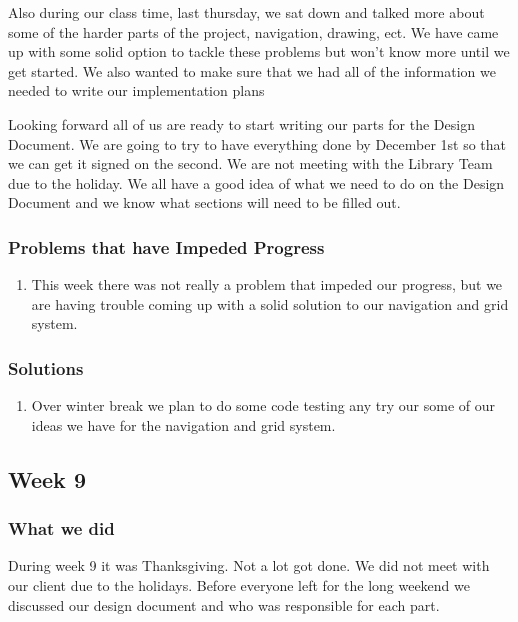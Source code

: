 \documentclass[letterpaper,10pt,titlepage, onecolumn, compsoc]{IEEEtran}
\begin{document}
Also during our class time, last thursday, we sat down and talked more about some of the harder parts of the project, navigation, drawing, ect. We have came up with some solid option to tackle these problems but won't know more until we get started. We also wanted to make sure that we had all of the information we needed to write our implementation plans

Looking forward all of us are ready to start writing our parts for the Design Document. We are going to try to have everything done by December 1st so that we can get it signed on the second. We are not meeting with the Library Team due to the holiday. We all have a good idea of what we need to do on the Design Document and we know what sections will need to be filled out.

\subsubsection{Problems that have Impeded Progress}
\begin{enumerate}
	\item This week there was not really a problem that impeded our progress, but we are having trouble coming up with a solid solution to our navigation and grid system.
\end{enumerate}

\subsubsection{Solutions}
\begin{enumerate}
	\item Over winter break we plan to do some code testing any try our some of our ideas we have for the navigation and grid system.
\end{enumerate}

\subsection{Week 9}


\subsubsection{What we did}
During week 9 it was Thanksgiving. Not a lot got done. We did not meet with our client due to the holidays. Before everyone left for the long weekend we discussed our design document and who was responsible for each part. 
\end{document}
